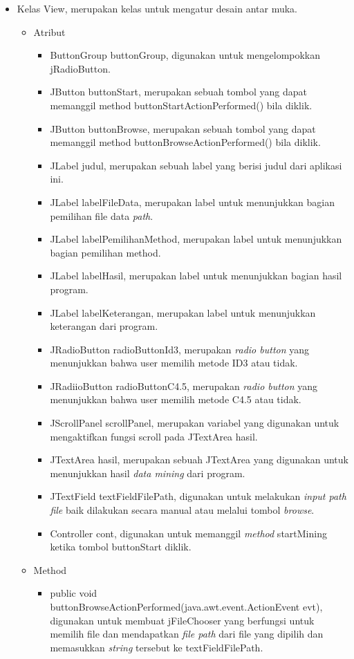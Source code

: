 \begin{itemize}
	
	\item Kelas View, merupakan kelas untuk mengatur desain antar muka.
	\begin{itemize}
		\item Atribut
		\begin{itemize}
			\item ButtonGroup buttonGroup, digunakan untuk mengelompokkan jRadioButton.
			\item JButton buttonStart, merupakan sebuah tombol yang dapat memanggil method buttonStartActionPerformed() bila diklik.
			\item JButton buttonBrowse, merupakan sebuah tombol yang dapat memanggil method buttonBrowseActionPerformed() bila diklik.
			\item JLabel judul, merupakan sebuah label yang berisi judul dari aplikasi ini.
			\item JLabel labelFileData, merupakan label untuk menunjukkan bagian pemilihan file data \textsl{path}.
			\item JLabel labelPemilihanMethod, merupakan label untuk menunjukkan bagian pemilihan method.
			\item JLabel labelHasil, merupakan label untuk menunjukkan bagian hasil program.
			\item JLabel labelKeterangan, merupakan label untuk menunjukkan keterangan dari program.
			\item JRadioButton radioButtonId3, merupakan \textsl{radio button} yang menunjukkan bahwa user memilih metode ID3 atau tidak.
			\item JRadiioButton radioButtonC4.5, merupakan \textsl{radio button} yang menunjukkan bahwa user memilih metode C4.5 atau tidak.
			\item JScrollPanel scrollPanel, merupakan variabel yang digunakan untuk mengaktifkan fungsi scroll pada JTextArea hasil.
			\item JTextArea hasil, merupakan sebuah JTextArea yang digunakan untuk menunjukkan hasil \textsl{data mining} dari program.
			\item JTextField textFieldFilePath, digunakan untuk melakukan \textsl{input path file }baik dilakukan secara manual atau melalui tombol \textsl{browse}.
			\item Controller cont, digunakan untuk memanggil \textsl{method} startMining ketika tombol buttonStart diklik.
		\end{itemize}
		\item Method
		\begin{itemize}
			\item public void buttonBrowseActionPerformed(java.awt.event.ActionEvent evt), digunakan untuk membuat jFileChooser yang berfungsi untuk memilih file dan mendapatkan \textsl{file path} dari file yang dipilih dan memasukkan \textsl{string }tersebut ke textFieldFilePath.

\end{itemize}
\end{itemize}
\end{itemize}
